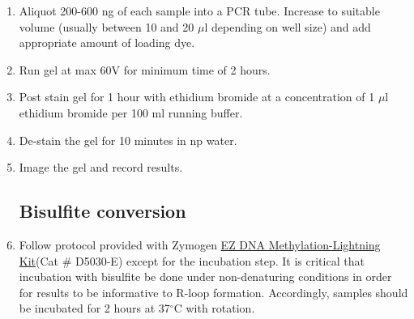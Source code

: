 \documentclass[12pt]{article}
\theoremstyle{definition}
\begin{document}
\begin{enumerate}
\item Aliquot 200-600 ng of each sample into a PCR tube. Increase to suitable volume (usually between 10 and 20 $\mu$l depending on well size) and add appropriate amount of loading dye. 

\item Run gel at max 60V for minimum time of 2 hours.

\item Post stain gel for 1 hour with ethidium bromide at a concentration of 1 $\mu$l ethidium bromide per 100 ml running buffer. 

\item De-stain the gel for 10 minutes in np water.

\item Image the gel and record results.

\subsection*{Bisulfite conversion}

\item Follow protocol provided with Zymogen \href{https://www.zymoresearch.com/collections/ez-dna-methylation-lightning-kits/products/ez-dna-methylation-lightning-kit}{EZ DNA Methylation-Lightning Kit}(Cat \# D5030-E) except for the incubation step. It is critical that incubation with bisulfite be done under non-denaturing conditions in order for results to be informative to R-loop formation. Accordingly, samples should be incubated for 2 hours at 37$^{\circ}$C with rotation. 




\end{enumerate}
\end{document}
